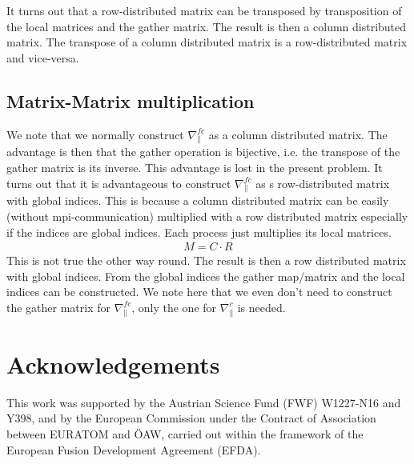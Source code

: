 \documentclass{hitec} %
\begin{document}
It turns out that a row-distributed matrix can be transposed
by transposition of the local matrices and the gather matrix.
The result is then a column distributed matrix.
The transpose of a column distributed matrix is a row-distributed matrix and vice-versa.

\subsection{Matrix-Matrix multiplication}
We note that we normally construct $\nabla_\parallel^{fc}$ as a column 
distributed
matrix. The advantage is then that the gather operation is bijective, i.e. the transpose of the gather matrix is its inverse. 
This advantage is lost in the present problem. 
It turns out that it is advantageous to construct $\nabla_\parallel^{fc}$
as s row-distributed matrix with global indices. 
This is because a column distributed matrix can be easily (without mpi-communication) multiplied
with a row distributed matrix especially if the indices are global indices. 
Each process just multiplies its local matrices.
\begin{align}
M = C\cdot R
\end{align}
This is not true the other way round. 
The result is then a row distributed matrix with global indices. 
From the global indices the gather map/matrix and the local
indices can be constructed.
We note here that we even don't need to construct the gather matrix
for $\nabla_\parallel^{fc}$, only the one for $\nabla_\parallel^c$ is
needed.


\section*{Acknowledgements} 	
This work was supported by the Austrian Science Fund (FWF) W1227-N16 and Y398, and by 
the European Commission under the Contract of Association between EURATOM and \"OAW, carried out within the framework of the European Fusion Development Agreement (EFDA).


%



\end{document}
